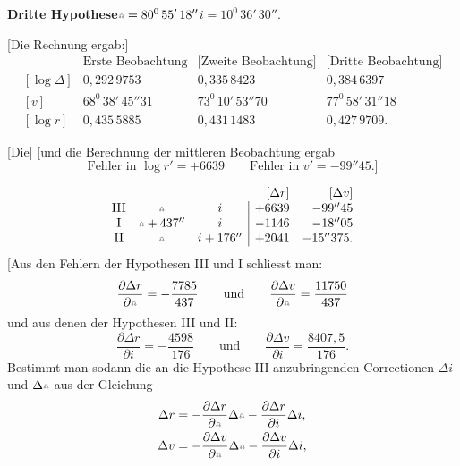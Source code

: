\clearpage
\begingroup
{}
\noindent\hspace*{\parindent}\textbf{Dritte Hypothese}\quad $\AstNode=80^0\,55'\,18''$\qquad $i=10^0\,36'\,30''$.
\par\medskip\noindent\hspace*{\parindent}[Die Rechnung ergab:]
{\small\setlength{\arraycolsep}{4pt}
\[
\begin{array}{rccc}
&\text{Erste Beobachtung}&\text{[Zweite Beobachtung]}&\text{[Dritte Beobachtung]}\\
{}[\log\Delta]&0{,}292\,9753&0{,}335\,8423&0{,}384\,6397\\
{}[v]&68^0\,38'\,45''31&73^0\,10'\,53''70&77^0\,58'\,31''18\\
{}[\log r]&0{,}435\,5885&0{,}431\,1483&0{,}427\,9709.
\end{array}
\]}
\noindent{\small [S. 7]}\par
\noindent\hspace*{\parindent}[Die]  [und die Berechnung der mittleren Beobachtung ergab
\[
\text{Fehler in }\log r'=+6639\qquad\text{Fehler in }v'=-99''45.]
\]
\begin{center}\end{center}
\noindent{\small [S. 8 u. 11]}
\[
\begin{array}{ccc|rr}
\multicolumn{3}{c}{}&[\Delta r]&[\Delta v]\\
\mathrm{III}&\AstNode&i&+6639&-99''45\\
\mathrm{I}&\AstNode+437''&i&-1146&-18''05\\
\mathrm{II}&\AstNode&i+176''&+2041&-15''375.
\end{array}
\]
\noindent\hspace*{\parindent}[Aus den Fehlern der Hypothesen III und I schliesst man:
\[
\frac{\partial\Delta r}{\partial\AstNode}=-\frac{7785}{437}\qquad\text{und}\qquad
\frac{\partial\Delta v}{\partial\AstNode}=\frac{11750}{437}
\]
\noindent und aus denen der Hypothesen III und II:
\[
\frac{\partial\Delta r}{\partial i}=-\frac{4598}{176}\qquad\text{und}\qquad
\frac{\partial\Delta v}{\partial i}=\frac{8407{,}5}{176}.
\]
\noindent\hspace*{\parindent}Bestimmt man sodann die an die Hypothese III anzubringenden Correctionen $\Delta i$ und $\Delta\AstNode$ aus der Gleichung
\[
\begin{aligned}
\Delta r&=-\frac{\partial\Delta r}{\partial\AstNode}\Delta\AstNode-\frac{\partial\Delta r}{\partial i}\Delta i,\\
\Delta v&=-\frac{\partial\Delta v}{\partial\AstNode}\Delta\AstNode-\frac{\partial\Delta v}{\partial i}\Delta i,
\end{aligned}
\]
